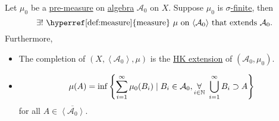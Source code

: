 \begin{corollary}
	Let \(\mu _0\) be a \hyperref[def:pre-measure]{pre-measure} on \hyperref[def:algebra]{algebra} \(\mathcal{A} _0\) on \(X\). Suppose \(\mu _0\) is \hyperref[def:finite-measure]{\(\sigma \)-finite}, then
	\[
		\exists! \text{ \hyperref[def:measure]{measure} \(\mu\) on \(\left< \mathcal{A} _0 \right> \) that extends \(\mathcal{A} _0\)}.
	\]
	Furthermore,
	\begin{itemize}
		\item The completion of \((X, \left< \mathcal{A} _0 \right>, \mu  )\) is the \hyperref[def:HK-extension]{HK extension} of \((\mathcal{A} _0, \mu _0)\).
		\item
		      \[
			      \mu (A) = \inf\left\{\sum\limits_{i=1}^{\infty} \mu _0(B_{i})\mid B_{i}\in \mathcal{A} _0, \underset{i\in\mathbb{\MakeUppercase{N}} }{\forall}\ \bigcup\limits_{i=1}^{\infty} B_{i}\supset A\right\}
		      \]
		      for all \(A\in \overline{\left< \mathcal{A} _0 \right> }\).
	\end{itemize}
\end{corollary}
